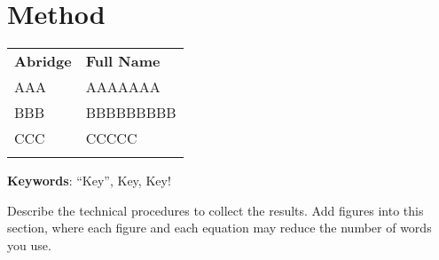 
\section{Method}
\label{sec:method}

\begin{table}[H]
  \centering
  \begin{tabularx}{\linewidth}{Y X}
    \Xhline{1pt}
    \textbf{Abridge} & \textbf{Full Name} \\
    \Xhline{1pt}
    AAA & AAAAAAA \\
    BBB & BBBBBBBBB \\
    CCC & CCCCC \\
    \Xhline{1pt}
  \end{tabularx}
  \label{tab:table}
\end{table}
\textbf{Keywords}: ``Key'', Key, Key!

Describe the technical procedures to collect the results.
Add figures into this section, where
each figure and each equation may reduce the number of words you use.